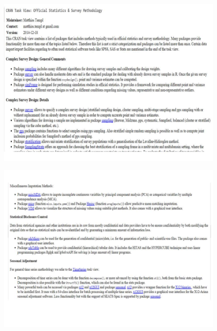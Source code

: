 \documentclass{beamer}
\begin{document}
\begin{frame}
\begin{figure}
\centering
\includegraphics[width=1.1\linewidth]{./JPEGS/Slide1}
\end{figure}
\end{frame}
\begin{frame}
\begin{figure}
\centering
\includegraphics[width=1.1\linewidth]{./JPEGS/Slide2}
\end{figure}
\end{frame}
\end{document}
